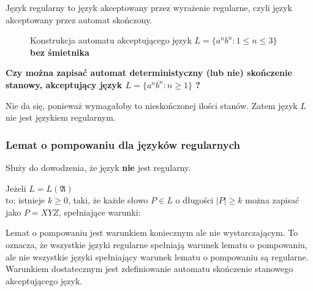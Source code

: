 \documentclass{../notatki}
\begin{document}
Język regularny to język akceptowany przez wyrażenie regularne, czyli język akceptowany przez automat skończony.

\begin{figure}[H]
    \centering
    \caption{Konstrukcja automatu akceptującego język $L = \{a^nb^n : 1 \le n \le 3\}$ \textbf{bez śmietnika}}
    \label{fig:cls:ex2}
\end{figure}

\par \noindent \textbf{Czy można zapisać automat deterministyczny (lub nie) skończenie stanowy, akceptujący język $L = \{a^nb^n : n \ge 1\}$ ?}

Nie da się, ponieważ wymagałoby to nieskończonej ilości stanów. Zatem język $L$ nie jest językiem regularnym.

\subsubsection{Lemat o pompowaniu dla języków regularnych}

Służy do dowodzenia, że język \textbf{nie} jest regularny.

Jeżeli $L = L(\mathfrak{A})$\\
\indent to: istnieje $k \ge 0$, taki, że każde słowo $P \in L$ o długości $|P| \ge k$ można zapisać jako $P = XYZ$, spełniające warunki:

Lemat o pompowaniu jest warunkiem koniecznym ale nie wystarczającym.
To oznacza, że wszystkie języki regularne spełniają warunek lematu o pompowaniu, ale nie wszystkie języki spełniający warunek lematu o pompowaniu są regularne.
Warunkiem dostatecznym jest zdefiniowanie automatu skończenie stanowego akceptującego język.
\end{document}
